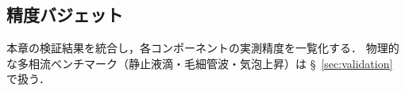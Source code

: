 %

\subsection{精度バジェット}
\label{sec:error_budget}

本章の検証結果を統合し，各コンポーネントの実測精度を一覧化する．
物理的な多相流ベンチマーク（静止液滴・毛細管波・気泡上昇）は §~\ref{sec:validation} で扱う．

